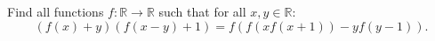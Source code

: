 Find all functions $f\colon \mathbb{R} \to \mathbb{R}$ such that for all $x,y\in\mathbb{R}$:
$$(f(x)+y)(f(x-y)+1)= f(f(xf(x+1)) - yf(y-1)).$$
